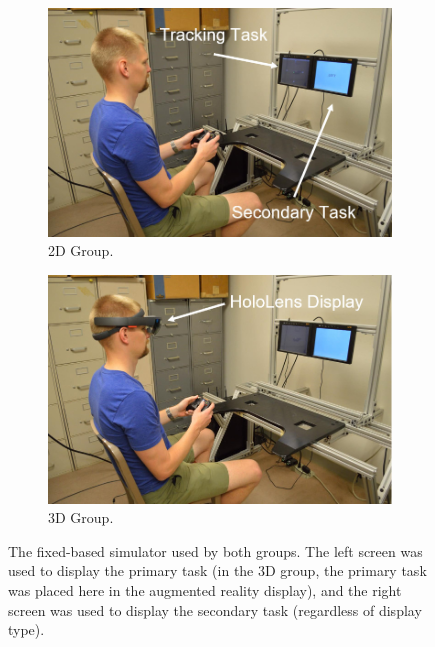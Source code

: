 \begin{figure}[b]
    \begin{center}
        \begin{subfigure}{0.49\textwidth}
            \includegraphics[width=\linewidth]{figures/AR/DSC_0801.JPG}
            \caption[2D Group]{2D Group.}
        \end{subfigure}\hfill
        \begin{subfigure}{0.49\textwidth}
            \includegraphics[width=\linewidth]{figures/AR/DSC_0803.JPG}
            \caption[3D Group]{3D Group.}
        \end{subfigure}
        \caption[The fixed-based simulator used by both groups]{The fixed-based simulator used by both groups. The left screen was used to display the primary task (in the 3D group, the primary task was placed here in the augmented reality display), and the right screen was used to display the secondary task (regardless of display type).}%
        \label{fig:simulator}%
    \end{center}
\end{figure}

